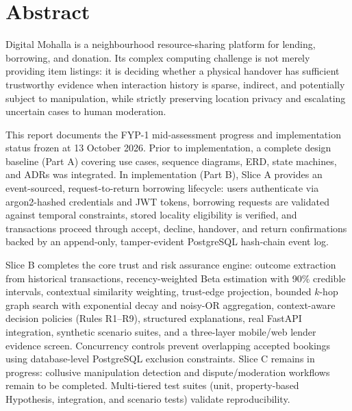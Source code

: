 \chapter*{Abstract}

Digital Mohalla is a neighbourhood resource-sharing platform for lending, borrowing, and donation. Its complex computing challenge is not merely providing item listings: it is deciding whether a physical handover has sufficient trustworthy evidence when interaction history is sparse, indirect, and potentially subject to manipulation, while strictly preserving location privacy and escalating uncertain cases to human moderation.

This report documents the FYP-1 mid-assessment progress and implementation status frozen at 13 October 2026. Prior to implementation, a complete design baseline (Part A) covering use cases, sequence diagrams, ERD, state machines, and ADRs was integrated. In implementation (Part B), Slice A provides an event-sourced, request-to-return borrowing lifecycle: users authenticate via argon2-hashed credentials and JWT tokens, borrowing requests are validated against temporal constraints, stored locality eligibility is verified, and transactions proceed through accept, decline, handover, and return confirmations backed by an append-only, tamper-evident PostgreSQL hash-chain event log. 

Slice B completes the core trust and risk assurance engine: outcome extraction from historical transactions, recency-weighted Beta estimation with 90\% credible intervals, contextual similarity weighting, trust-edge projection, bounded $k$-hop graph search with exponential decay and noisy-OR aggregation, context-aware decision policies (Rules R1--R9), structured explanations, real FastAPI integration, synthetic scenario suites, and a three-layer mobile/web lender evidence screen. Concurrency controls prevent overlapping accepted bookings using database-level PostgreSQL exclusion constraints. Slice C remains in progress: collusive manipulation detection and dispute/moderation workflows remain to be completed. Multi-tiered test suites (unit, property-based Hypothesis, integration, and scenario tests) validate reproducibility.

